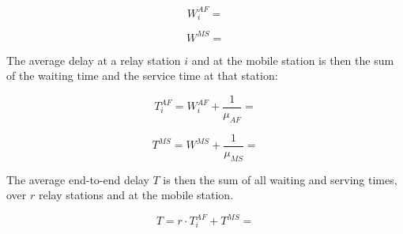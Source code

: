 \begin{equation}
  W_i^{AF} =
  \label{eq:02_6}
\end{equation}

\begin{equation}
  W^{MS} =
  \label{eq:02_7}
\end{equation}


The average delay at a relay station $i$ and at the mobile station is then the
sum of the waiting time and the service time at that station:

\begin{equation}
  T_i^{AF} = W_i^{AF} + \dfrac{1}{\mu_{AF}} =
  \label{eq:02_8}
\end{equation}

\begin{equation}
  T^{MS} = W^{MS} + \dfrac{1}{\mu_{MS}} =
  \label{eq:02_9}
\end{equation}


The average end-to-end delay $T$ is then the sum of all waiting and serving times,
over $r$ relay stations and at the mobile station.


\begin{equation}
  T = r \cdot T_i^{AF} + T^{MS} =
\end{equation}
